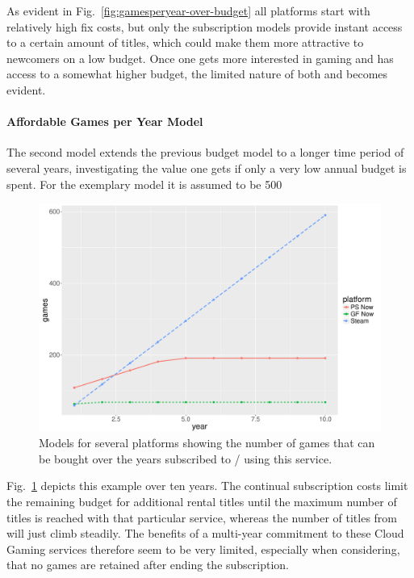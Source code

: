 As evident in Fig.~\ref{fig:gamesperyear-over-budget} all platforms start with relatively high fix costs, but only the subscription models provide instant access to a certain amount of titles, which could make them more attractive to newcomers on a low budget. Once one gets more interested in gaming and has access to a somewhat higher budget, the limited nature of both \psnow and \gfnow becomes evident.


\paragraph{Affordable Games per Year Model}

The second model extends the previous budget model to a longer time period of several years, investigating the value one gets if only a very low annual budget is spent. For the exemplary model it is assumed to be \SI{500}{\EUR}

\begin{figure}[!t]
	\centering
	\includegraphics[width=1.0\columnwidth]{images/games-over-year.pdf}
	\caption{Models for several platforms showing the number of games that can be bought over the years subscribed to / using this service.}
\label{fig:games-over-years}
\end{figure}

Fig.~\ref{fig:games-over-years} depicts this example over ten years. The continual subscription costs limit the remaining budget for additional rental titles until the maximum number of titles is reached with that particular service, whereas the number of titles from \steam will just climb steadily. The benefits of a multi-year commitment to these Cloud Gaming services therefore seem to be very limited, especially when considering, that no games are retained after ending the subscription.


